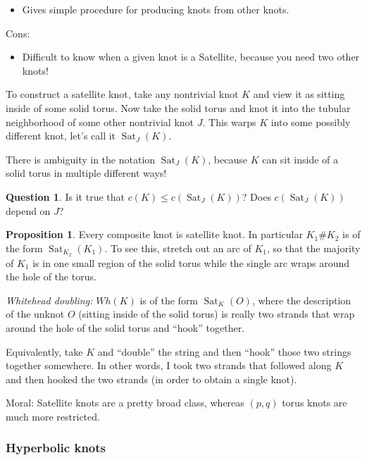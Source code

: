 \documentclass[11pt]{article}
\DeclareMathOperator{\Sat}{Sat}
\theoremstyle{plain}
\theoremstyle{definition}
\newtheorem{prop}{Proposition}
\newtheorem{question}{Question}
\begin{document}
\begin{itemize}
  \item Gives simple procedure for producing knots from other knots.
\end{itemize}

Cons:

\begin{itemize}
  \item Difficult to know when a given knot is a Satellite, because you need two other knots!
\end{itemize}

To construct a satellite knot, take any nontrivial knot $K$ and view it as sitting inside of some solid torus. Now take the solid torus and knot it into the tubular neighborhood of some other nontrivial knot $J$. This warps $K$ into some possibly different knot, let's call it
$\Sat_{J}(K)$.

There is ambiguity in the notation $\Sat_J(K)$, because $K$ can sit inside of a solid torus in multiple different ways!

\begin{question}
  Is it true that $c(K)\le c(\Sat_{J}(K))$? Does $c(\Sat_{J}(K))$ depend on $J$?
\end{question}


\begin{prop}
  Every composite knot is satellite knot. In particular $K_1 \# K_2$ is of the form $\Sat_{K_2}(K_1)$. To see this, stretch out an arc of $K_1$, so that the majority of $K_1$ is in one small region of the solid torus while the single arc wraps around the hole of the torus. 
\end{prop}

\textit{Whitehead doubling:}
$Wh(K)$ is of the form $\Sat_K(O)$, where the description of the unknot $O$ (sitting inside of the solid torus) is really two strands that wrap around the hole of the solid torus and ``hook'' together.

Equivalently, take $K$ and ``double'' the string and then ``hook'' those two strings together somewhere. In other words, I took two strands that followed along $K$ and then hooked the two strands (in order to obtain a single knot).

\bigskip
Moral: Satellite knots are a pretty broad class, whereas $(p,q)$ torus knots are much more restricted.

\subsubsection{Hyperbolic knots}
\end{document}

